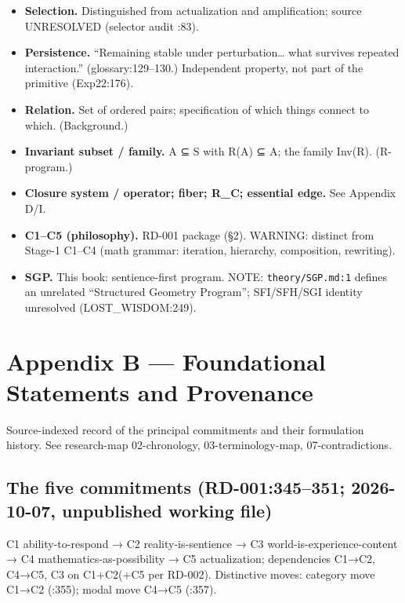 \documentclass[
  11pt,
]{book}
\begin{document}
\begin{itemize}
  (RD-001:349.) Frozen: without selection = standard math
  (differentiator + instability).
\item
  \textbf{Selection.} Distinguished from actualization and
  amplification; source UNRESOLVED (selector audit :83).
\item
  \textbf{Persistence.} ``Remaining stable under perturbation\ldots{}
  what survives repeated interaction.'' (glossary:129--130.) Independent
  property, not part of the primitive (Exp22:176).
\item
  \textbf{Relation.} Set of ordered pairs; specification of which things
  connect to which. (Background.)
\item
  \textbf{Invariant subset / family.} A ⊆ S with R(A) ⊆ A; the family
  Inv(R). (R-program.)
\item
  \textbf{Closure system / operator; fiber; R\_C; essential edge.} See
  Appendix D/I.
\item
  \textbf{C1--C5 (philosophy).} RD-001 package (§2). WARNING: distinct
  from Stage-1 C1--C4 (math grammar: iteration, hierarchy, composition,
  rewriting).
\item
  \textbf{SGP.} This book: sentience-first program. NOTE:
  \texttt{theory/SGP.md:1} defines an unrelated ``Structured Geometry
  Program''; SFI/SFH/SGI identity unresolved (LOST\_WISDOM:249).
\end{itemize}

\newpage

\chapter{Appendix B --- Foundational Statements and
Provenance}\label{appendix-b-foundational-statements-and-provenance}

Source-indexed record of the principal commitments and their formulation
history. See research-map 02-chronology, 03-terminology-map,
07-contradictions.

\section{The five commitments (RD-001:345--351; 2026-10-07, unpublished
working
file)}\label{the-five-commitments-rd-001345351-2026-10-07-unpublished-working-file}

C1 ability-to-respond → C2 reality-is-sentience → C3
world-is-experience-content → C4 mathematics-as-possibility → C5
actualization; dependencies C1→C2, C4→C5, C3 on C1+C2(+C5 per RD-002).
Distinctive moves: category move C1→C2 (:355); modal move C4→C5 (:357).
\end{document}

